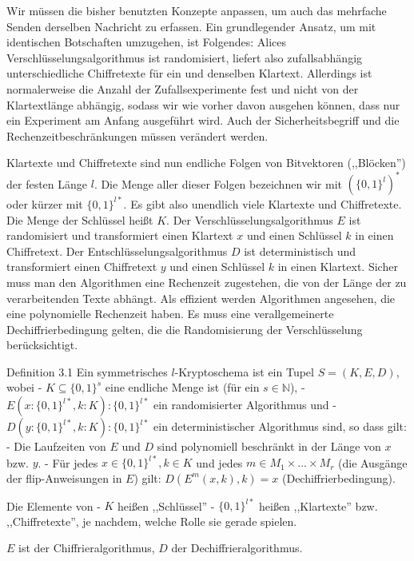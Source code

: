 \documentclass[a4paper]{article}
\begin{document}
\begin{multicols}{3}
        Wir müssen die bisher benutzten Konzepte anpassen, um auch das mehrfache Senden derselben Nachricht zu erfassen. Ein grundlegender Ansatz, um mit identischen Botschaften umzugehen, ist Folgendes: Alices Verschlüsselungsalgorithmus ist randomisiert, liefert also zufallsabhängig unterschiedliche Chiffretexte für ein und denselben Klartext. Allerdings ist normalerweise die Anzahl der Zufallsexperimente fest und nicht von der Klartextlänge abhängig, sodass wir wie vorher davon ausgehen können, dass nur ein Experiment am Anfang ausgeführt wird. Auch der Sicherheitsbegriff und die Rechenzeitbeschränkungen müssen verändert werden.

        Klartexte und Chiffretexte sind nun endliche Folgen von Bitvektoren (,,Blöcken'') der festen Länge $l$. Die Menge aller dieser Folgen bezeichnen wir mit $(\{0,1\}^l)^*$ oder kürzer mit $\{0,1\}^{l*}$. Es gibt also unendlich viele Klartexte und Chiffretexte. Die Menge der Schlüssel heißt $K$. Der Verschlüsselungsalgorithmus $E$ ist randomisiert und transformiert einen Klartext $x$ und einen Schlüssel $k$ in einen Chiffretext. Der Entschlüsselungsalgorithmus $D$ ist deterministisch und transformiert einen Chiffretext $y$ und einen Schlüssel $k$ in einen Klartext. Sicher muss man den Algorithmen eine Rechenzeit zugestehen, die von der Länge der zu verarbeitenden Texte abhängt. Als effizient werden Algorithmen angesehen, die eine polynomielle Rechenzeit haben. Es muss eine verallgemeinerte Dechiffrierbedingung gelten, die die Randomisierung der Verschlüsselung berücksichtigt.

        Definition 3.1 Ein symmetrisches $l$-Kryptoschema ist ein Tupel $S= (K,E,D)$, wobei
        - $K\subseteq\{0,1\}^s$ eine endliche Menge ist (für ein $s\in\mathbb{N}$),
        - $E(x:\{0,1\}^{l*},k:K) :\{0,1\}^{l*}$ ein randomisierter Algorithmus und
        - $D(y:\{0,1\}^{l*},k:K) :\{0,1\}^{l*}$ ein deterministischer Algorithmus
        sind, so dass gilt:
        - Die Laufzeiten von $E$ und $D$ sind polynomiell beschränkt in der Länge von $x$ bzw. $y$.
        - Für jedes $x\in\{0,1\}^{l*},k\in K$ und jedes $m\in M_1\times...\times M_r$ (die Ausgänge der flip-Anweisungen in $E$) gilt: $D(E^m(x,k),k)=x$ (Dechiffrierbedingung).

        Die Elemente von
        - $K$ heißen ,,Schlüssel''
        - $\{0,1\}^{l*}$ heißen ,,Klartexte'' bzw. ,,Chiffretexte'', je nachdem, welche Rolle sie gerade spielen.

    $E$ ist der Chiffrieralgorithmus, $D$ der Dechiffrieralgorithmus.


\end{multicols}
\end{document}
